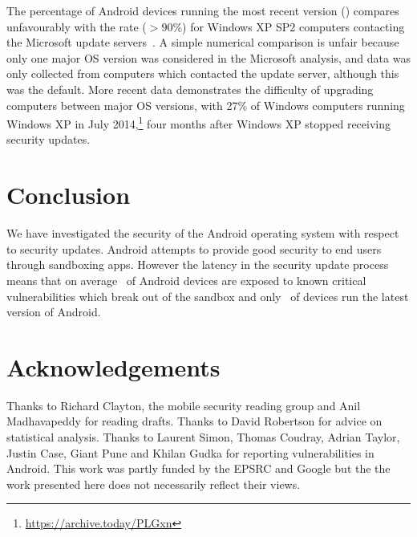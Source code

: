 \documentclass{llncs}
\newcommand{\identifying}[1]{#1}%
\begin{document}


The percentage of Android devices running the most recent version (\daUpdatednessPerc) compares unfavourably with the rate ($>90$\%) for Windows XP SP2 computers contacting the Microsoft update servers~\cite{Gkantsidis2006}.
A simple numerical comparison is unfair because only one major OS version was considered in the Microsoft analysis, and data was only collected from computers which contacted the update server, although this was the default.
More recent data demonstrates the difficulty of upgrading computers between major OS versions, with 27\% of Windows computers running Windows XP in July 2014,\footnote{\url{https://archive.today/PLGxn}} four months after Windows XP stopped receiving security updates.



\section{Conclusion}
\label{sec:conclusion}
We have investigated the security of the Android operating system with respect to security updates.
Android attempts to provide good security to end users through sandboxing apps.
However the latency in the security update process means that on average \daMeanInsecurityPerc\ of Android devices are exposed to known critical vulnerabilities which break out of the sandbox and only \daUpdatednessPerc\ of devices run the latest version of Android.

\identifying{
\section*{Acknowledgements}
Thanks to Richard Clayton, the mobile security reading group and Anil Madhavapeddy for reading drafts.
Thanks to David Robertson for advice on statistical analysis.
Thanks to Laurent Simon, Thomas Coudray, Adrian Taylor, Justin Case, Giant Pune and Khilan Gudka for reporting vulnerabilities in Android.
This work was partly funded by the EPSRC and Google but the the work presented here does not necessarily reflect their views.
}

\printbibliography
\end{document}
